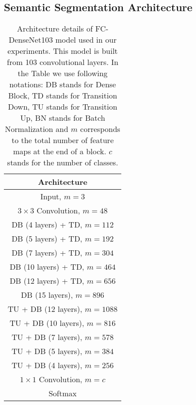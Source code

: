\documentclass[10pt,twocolumn,letterpaper]{article}
\begin{document}
\subsection{Semantic Segmentation Architecture}
\label{ssec:architecture}



\begin{table}[!b]
    \begin{minipage}{\linewidth}
\centering
      \begin{tabular}{| c |}
      \hline 
  	  \multicolumn{1}{|c|}{\textbf{Architecture}}\\ \hline   \hline 
      \multicolumn{1}{|c|}{Input, $m=3$} \\ \hline 
      \multicolumn{1}{|c|}{$3\times3$ Convolution, $m=48$}\\ \hline 
  
DB (4 layers) + TD, $m=112$ \\ \hline 
      DB (5 layers) + TD, $m=192$ \\ \hline 
      DB (7 layers) + TD, $m=304$ \\ \hline 
      DB (10 layers) + TD, $m=464$ \\ \hline 
      DB (12 layers) + TD, $m=656$ \\ \hline 
      \multicolumn{1}{|c|}{DB (15 layers), $m=896$} \\ \hline 
  
TU + DB (12 layers), $m=1088$ \\ \hline 
      TU + DB (10 layers), $m=816$ \\\hline 
      TU + DB (7 layers), $m=578$ \\ \hline 
      TU + DB (5 layers), $m=384$ \\ \hline 
      TU + DB (4 layers), $m=256$\\ \hline
\multicolumn{1}{|c|}{$1\times1$ Convolution, $m=c$} \\ \hline 
      \multicolumn{1}{|c|}{Softmax} \\ \hline 
      \end{tabular}
    \end{minipage}\vspace{0.2cm}
\caption{Architecture details of FC-DenseNet103 model used in our experiments. This model is built from 103 convolutional layers. In the Table we use following notations: DB stands for Dense Block, TD stands for Transition Down, TU stands for Transition Up, BN stands for Batch Normalization and $m$ corresponds to the total number of feature maps at the end of a block. $c$ stands for the number of classes.}
\label{tab:architecture}
\end{table}
\end{document}
